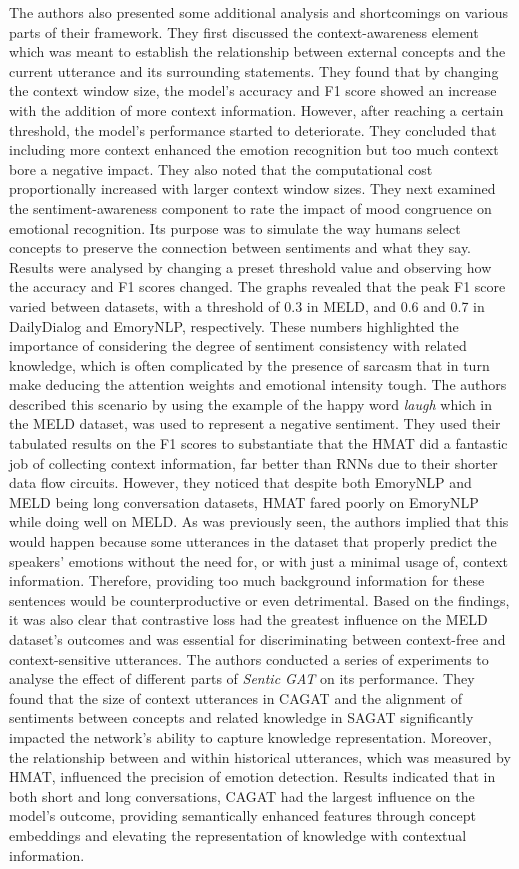 The authors also presented some additional analysis and shortcomings on various parts of their framework. They first discussed the context-awareness element which was meant to establish the relationship between external concepts and the current utterance and its surrounding statements. They found that by changing the context window size, the model's accuracy and F1 score showed an increase with the addition of more context information. However, after reaching a certain threshold, the model's performance started to deteriorate. They concluded that including more context enhanced the emotion recognition but too much context bore a negative impact. They also noted that the computational cost proportionally increased with larger context window sizes. They next examined the sentiment-awareness component to rate the impact of mood congruence on emotional recognition. Its purpose was to simulate the way humans select concepts to preserve the connection between sentiments and what they say. Results were analysed by changing a preset threshold value and observing how the accuracy and F1 scores changed. The graphs revealed that the peak F1 score varied between datasets, with a threshold of 0.3 in MELD, and 0.6 and 0.7 in DailyDialog and EmoryNLP, respectively. These numbers highlighted the importance of considering the degree of sentiment consistency with related knowledge, which is often complicated by the presence of sarcasm that in turn make deducing the attention weights and emotional intensity tough. The authors described this scenario by using the example of the happy word \textit{laugh} which in the MELD dataset, was used to represent a negative sentiment. They used their tabulated results on the F1 scores to substantiate that the HMAT did a fantastic job of collecting context information, far better than RNNs due to their shorter data flow circuits. However, they noticed that despite both EmoryNLP and MELD being long conversation datasets, HMAT fared poorly on EmoryNLP while doing well on MELD. As was previously seen, the authors implied that this would happen because some utterances in the dataset that properly predict the speakers' emotions without the need for, or with just a minimal usage of, context information. Therefore, providing too much background information for these sentences would be counterproductive or even detrimental. Based on the findings, it was also clear that contrastive loss had the greatest influence on the MELD dataset's outcomes and was essential for discriminating between context-free and context-sensitive utterances. The authors conducted a series of experiments to analyse the effect of different parts of \textit{Sentic GAT} on its performance. They found that the size of context utterances in CAGAT and the alignment of sentiments between concepts and related knowledge in SAGAT significantly impacted the network's ability to capture knowledge representation. Moreover, the relationship between and within historical utterances, which was measured by HMAT, influenced the precision of emotion detection. Results indicated that in both short and long conversations, CAGAT had the largest influence on the model's outcome, providing semantically enhanced features through concept embeddings and elevating the representation of knowledge with contextual information.

